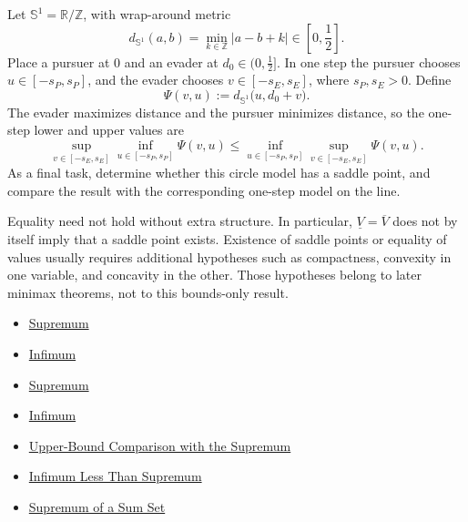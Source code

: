 \begin{remark*}[Interpretation]
Let \(\mathbb{S}^1=\mathbb{R}/\mathbb{Z}\), with wrap-around metric
\[
  d_{\mathbb{S}^1}(a,b)
  =
  \min_{k\in\mathbb{Z}} |a-b+k|
  \in
  \left[0,\frac12\right].
\]
Place a pursuer at \(0\) and an evader at \(d_0\in(0,\frac12]\). In one
step the pursuer chooses \(u\in[-s_P,s_P]\), and the evader chooses
\(v\in[-s_E,s_E]\), where \(s_P,s_E>0\). Define
\[
  \Psi(v,u):=d_{\mathbb{S}^1}\bigl(u,d_0+v\bigr).
\]
The evader maximizes distance and the pursuer minimizes distance, so the
one-step lower and upper values are
\[
  \sup_{v\in[-s_E,s_E]}\inf_{u\in[-s_P,s_P]}\Psi(v,u)
  \le
  \inf_{u\in[-s_P,s_P]}\sup_{v\in[-s_E,s_E]}\Psi(v,u).
\]
As a final task, determine whether this circle model has a saddle point,
and compare the result with the corresponding one-step model on the line.
\end{remark*}

\begin{remark*}[Interpretation]
Equality need not hold without extra structure. In particular,
\(\underline V=\overline V\) does not by itself imply that a saddle point
exists. Existence of saddle points or equality of values usually requires
additional hypotheses such as compactness, convexity in one variable, and
concavity in the other. Those hypotheses belong to later minimax theorems,
not to this bounds-only result.
\end{remark*}

\begin{remark*}[Interpretation]
\begin{itemize}
  \item \hyperref[def:supremum]{Supremum}
  \item \hyperref[def:infimum]{Infimum}
\end{itemize}
\end{remark*}

\begin{remark*}[Interpretation]
\begin{itemize}
  \item \hyperref[def:supremum]{Supremum}
  \item \hyperref[def:infimum]{Infimum}
  \item \hyperref[prop:upper-bound-comparison-with-the-supremum]{Upper-Bound Comparison with the Supremum}
  \item \hyperref[thm:infimum-less-than-supremum]{Infimum Less Than Supremum}
  \item \hyperref[thm:supremum-sum-set]{Supremum of a Sum Set}
\end{itemize}
\end{remark*}

